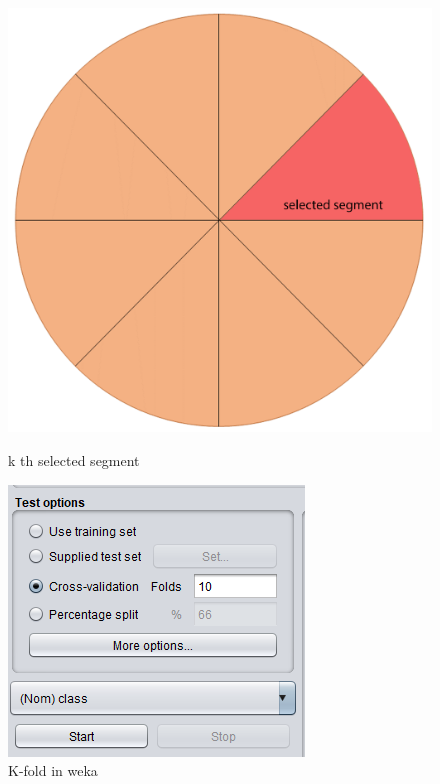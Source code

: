 \begin{figure}[h]
   \begin{minipage}{0.48\textwidth}
     \centering
     \includegraphics[width=0.60\linewidth]{imgs/capitolo4/kfold1.png}
     \caption{k th selected segment}
         \label{fig:split2}
   \end{minipage}\hfill
   \begin{minipage}{0.48\textwidth}
     \centering
     \includegraphics[width=0.60\linewidth]{imgs/capitolo4/weka_kcross.png}
     \caption{K-fold in weka}
     \label{fig:split1}
   \end{minipage}
\end{figure}

